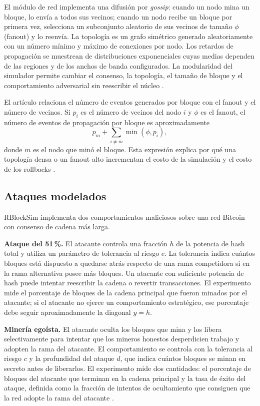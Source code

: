 \documentclass[11pt,a4paper,oneside]{article}
\begin{document}
El módulo de red implementa una difusión por \emph{gossip}: cuando un nodo mina un bloque, lo envía a todos sus vecinos; cuando un nodo recibe un bloque por primera vez, selecciona un subconjunto aleatorio de sus vecinos de tamaño $\phi$ (fanout) y lo reenvía. La topología es un grafo simétrico generado aleatoriamente con un número mínimo y máximo de conexiones por nodo. Los retardos de propagación se muestrean de distribuciones exponenciales cuyas medias dependen de las regiones y de los anchos de banda configurados. La modularidad del simulador permite cambiar el consenso, la topología, el tamaño de bloque y el comportamiento adversarial sin reescribir el núcleo \cite{pimpini2025rblocksim}.

El artículo relaciona el número de eventos generados por bloque con el fanout y el número de vecinos. Si $p_i$ es el número de vecinos del nodo $i$ y $\phi$ es el fanout, el número de eventos de propagación por bloque es aproximadamente
\begin{equation}
  p_m + \sum_{i \ne m} \min(\phi, p_i),
  \label{eq:events}
\end{equation}
donde $m$ es el nodo que minó el bloque. Esta expresión explica por qué una topología densa o un fanout alto incrementan el costo de la simulación y el costo de los rollbacks \cite{pimpini2025rblocksim}.

\subsection{Ataques modelados}

RBlockSim implementa dos comportamientos maliciosos sobre una red Bitcoin con consenso de cadena más larga.

\textbf{Ataque del 51\,\%.} El atacante controla una fracción $h$ de la potencia de hash total y utiliza un parámetro de tolerancia al riesgo $c$. La tolerancia indica cuántos bloques está dispuesto a quedarse atrás respecto de una rama competidora si en la rama alternativa posee más bloques. Un atacante con suficiente potencia de hash puede intentar reescribir la cadena o revertir transacciones. El experimento mide el porcentaje de bloques de la cadena principal que fueron minados por el atacante; si el atacante no ejerce un comportamiento estratégico, ese porcentaje debe seguir aproximadamente la diagonal $y=h$.

\textbf{Minería egoísta.} El atacante oculta los bloques que mina y los libera selectivamente para intentar que los mineros honestos desperdicien trabajo y adopten la rama del atacante. El comportamiento se controla con la tolerancia al riesgo $c$ y la profundidad del ataque $d$, que indica cuántos bloques se minan en secreto antes de liberarlos. El experimento mide dos cantidades: el porcentaje de bloques del atacante que terminan en la cadena principal y la tasa de éxito del ataque, definida como la fracción de intentos de ocultamiento que consiguen que la red adopte la rama del atacante \cite{eyal2014majority,pimpini2025rblocksim}.
\end{document}
